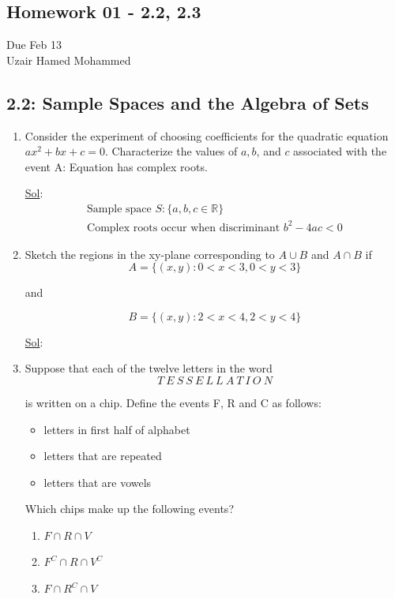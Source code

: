 \begin{center}
  \section*{Homework 01 - 2.2, 2.3}
  Due Feb 13 \\
  Uzair Hamed Mohammed
\end{center}


\subsection*{2.2: Sample Spaces and the Algebra of Sets}

\begin{enumerate}
  \item[12.] Consider the experiment of choosing coefficients for the
    quadratic equation \( ax^2 + bx + c = 0 \). Characterize the
    values of \(a, b\), and \(c\) associated with the event A:
    Equation has complex roots.

    \underline{Sol}:
    \[
      \begin{aligned}
        \textrm{Sample space } S: \lbrace a, b, c \in \mathbb{R} \rbrace \\
        \textrm{Complex roots occur when discriminant } \boxed{b^2 -4ac < 0}
      \end{aligned}
    \]

  \item[16.] Sketch the regions in the xy-plane corresponding to \(A
    \cup B\) and \(A \cap B\) if
    \[
      A = \lbrace (x, y): 0 < x < 3, 0 < y < 3 \rbrace
    \]

    and

    \[
      B = \lbrace (x, y): 2 < x < 4, 2 < y < 4 \rbrace
    \]

    \underline{Sol}: \vspace{2.0in}

  \item[22.] Suppose that each of the twelve letters in the word
    \[
      T \ E \ S \ S \ E \ L \ L \ A \ T \ I \ O \ N
    \]

    is written on a chip. Define the events F, R and C as follows:
    \begin{itemize}
      \item[F: ] letters in first half of alphabet
      \item[R: ] letters that are repeated
      \item[V: ] letters that are vowels
    \end{itemize}
    Which chips make up the following events?
    \begin{enumerate}
      \item[a.] \(F \cap R \cap V\)
      \item[b.] \(F^C \cap R \cap V^C\)
      \item[c.] \(F \cap R^C \cap V\)
    \end{enumerate}


\end{enumerate}
